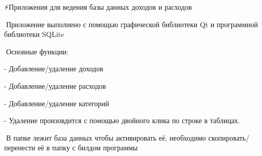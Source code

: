 ⚡Приложения для ведения базы данных доходов и расходов

📄Приложение выполнено с помощью графической библиотеки Qt и программной библиотеки SQLite

🔨Основные функции\+: \begin{DoxyVerb}- Добавление/удаление доходов

- Добавление/удаление расходов

- Добавление/удаление категорий

- Удаление произовдится с помощью двойного клика по строке в таблицах.
\end{DoxyVerb}
 🔧В папке лежит база данных чтобы активировать её, необходимо скопировать/перенести её в папку с билдом программы 